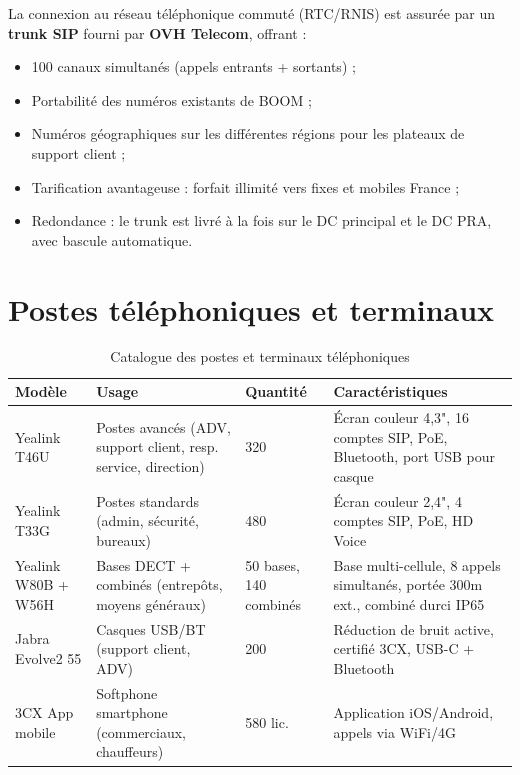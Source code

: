\documentclass[12pt,a4paper]{report}
\begin{document}
La connexion au réseau téléphonique commuté (RTC/RNIS) est assurée par un \textbf{trunk SIP} fourni par \textbf{OVH Telecom}, offrant :

\begin{itemize}
\item 100 canaux simultanés (appels entrants + sortants) ;
\item Portabilité des numéros existants de BOOM ;
\item Numéros géographiques sur les différentes régions pour les plateaux de support client ;
\item Tarification avantageuse : forfait illimité vers fixes et mobiles France ;
\item Redondance : le trunk est livré à la fois sur le DC principal et le DC PRA, avec bascule automatique.
\end{itemize}

\section{Postes téléphoniques et terminaux}

\begin{table}[H]
\centering
\small
\begin{tabularx}{\textwidth}{@{}L{3cm}L{3.4cm}C{1.8cm}L{4.5cm}@{}}
\toprule
\textbf{Modèle} & \textbf{Usage} & \textbf{Quantité} & \textbf{Caractéristiques} \\
\midrule
Yealink T46U & Postes avancés (ADV, support client, resp. service, direction) & 320 & Écran couleur 4,3", 16 comptes SIP, PoE, Bluetooth, port USB pour casque \\
\addlinespace
Yealink T33G & Postes standards (admin, sécurité, bureaux) & 480 & Écran couleur 2,4", 4 comptes SIP, PoE, HD Voice \\
\addlinespace
Yealink W80B + W56H & Bases DECT + combinés (entrepôts, moyens généraux) & 50 bases, 140 combinés & Base multi-cellule, 8 appels simultanés, portée 300m ext., combiné durci IP65 \\
\addlinespace
Jabra Evolve2 55 & Casques USB/BT (support client, ADV) & 200 & Réduction de bruit active, certifié 3CX, USB-C + Bluetooth \\
\addlinespace
3CX App mobile & Softphone smartphone (commerciaux, chauffeurs) & 580 lic. & Application iOS/Android, appels via WiFi/4G \\
\bottomrule
\end{tabularx}
\caption{Catalogue des postes et terminaux téléphoniques}
\label{tab:postes_tel}
\end{table}
\end{document}
